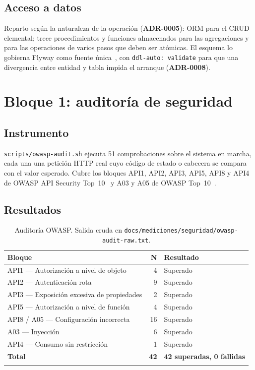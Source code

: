 \documentclass[11pt,a4paper]{article}
\newcommand{\adr}[1]{\textbf{ADR-#1}}
\begin{document}
\subsection{Acceso a datos}

Reparto según la naturaleza de la operación (\adr{0005}): ORM para el CRUD
elemental; trece procedimientos y funciones almacenados para las agregaciones y
para las operaciones de varios pasos que deben ser atómicas. El esquema lo
gobierna Flyway como fuente única~\cite{ambler2006refactoring}, con
\texttt{ddl-auto: validate} para que una divergencia entre entidad y tabla impida
el arranque (\adr{0008}).

\section{Bloque 1: auditoría de seguridad}\label{sec:seguridad}

\subsection{Instrumento}

\texttt{scripts/owasp-audit.sh} ejecuta 51 comprobaciones sobre el sistema en
marcha, cada una una petición HTTP real cuyo código de estado o cabecera se
compara con el valor esperado. Cubre los bloques API1, API2, API3, API5, API8 y
API4 de OWASP API Security Top~10~\cite{owaspapi2023} y A03 y A05 de OWASP
Top~10~\cite{owasptop102021}.

\subsection{Resultados}

\begin{longtable}{@{}p{7.2cm}rp{5.5cm}@{}}
\toprule
\textbf{Bloque} & \textbf{N} & \textbf{Resultado} \\
\midrule
\endhead
API1 --- Autorización a nivel de objeto & 4 & Superado \\
API2 --- Autenticación rota & 9 & Superado \\
API3 --- Exposición excesiva de propiedades & 2 & Superado \\
API5 --- Autorización a nivel de función & 4 & Superado \\
API8 / A05 --- Configuración incorrecta & 16 & Superado \\
A03 --- Inyección & 6 & Superado \\
API4 --- Consumo sin restricción & 1 & Superado \\
\midrule
\textbf{Total} & \textbf{42} & \textbf{42 superadas, 0 fallidas} \\
\bottomrule
\caption{Auditoría OWASP. Salida cruda en
\texttt{docs/mediciones/seguridad/owasp-audit-raw.txt}.}
\end{longtable}
\end{document}
